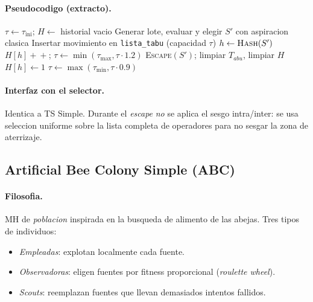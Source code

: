 \documentclass[11pt,a4paper]{article}
\newcommand{\mh}{MH}
\newcommand{\code}[1]{\texttt{#1}}
\begin{document}
\paragraph{Pseudocodigo (extracto).}
\begin{algorithm}[H]
\caption{Reactive Tabu Search}
\begin{algorithmic}[1]
\State $\tau \gets \tau_{\text{ini}}$;\; $H \gets$ historial vacio
  \State Generar lote, evaluar y elegir $S'$ con aspiracion clasica
  \State Insertar movimiento en \code{lista\_tabu} (capacidad $\tau$)
  \State $h \gets \textsc{Hash}(S')$
     \State $H[h]\!+\!+$;\; $\tau \gets \min(\tau_{\max}, \tau\cdot 1.2)$
        \State \textsc{Escape}$(S')$; limpiar $T_{abu}$, limpiar $H$
     \EndIf
  \Else{}
     \State $H[h]\gets 1$
        \State $\tau\gets\max(\tau_{\min}, \tau\cdot 0.9)$
     \EndIf
  \EndIf
\EndFor
\end{algorithmic}
\end{algorithm}

\paragraph{Interfaz con el selector.} Identica a TS Simple. Durante
el \emph{escape} \emph{no} se aplica el sesgo intra/inter: se usa
seleccion uniforme sobre la lista completa de operadores para no
sesgar la zona de aterrizaje.

\subsection{Artificial Bee Colony Simple (ABC)}\label{sec:abc}

\paragraph{Filosofia.} \mh{} de \emph{poblacion} inspirada en la
busqueda de alimento de las abejas. Tres tipos de individuos:
\begin{itemize}
\item \emph{Empleadas}: explotan localmente cada fuente.
\item \emph{Observadoras}: eligen fuentes por fitness proporcional
(\emph{roulette wheel}).
\item \emph{Scouts}: reemplazan fuentes que llevan demasiados
intentos fallidos.
\end{itemize}
\end{document}
